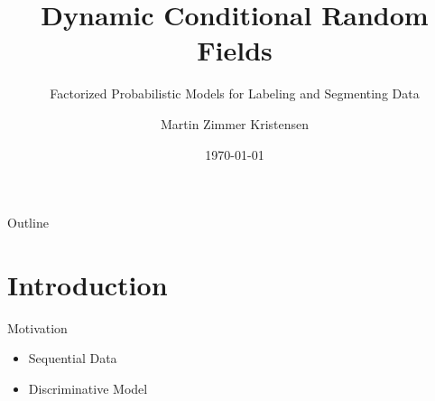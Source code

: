 \documentclass[presentation,bigger]{beamer}
\author{Martin Zimmer Kristensen}
\date{\today}
\title{Dynamic Conditional Random Fields}
\subtitle{Factorized Probabilistic Models for Labeling and Segmenting Data}
\begin{document}
\maketitle
\begin{frame}{Outline}
\setcounter{tocdepth}{1}
\tableofcontents
\end{frame}

\section{Introduction}
\label{sec:orgheadline11}
\begin{frame}[label={sec:orgheadline1}]{Motivation}
\begin{itemize}
\item Sequential Data
\item Discriminative Model
\end{itemize}
\end{frame}
\end{document}
